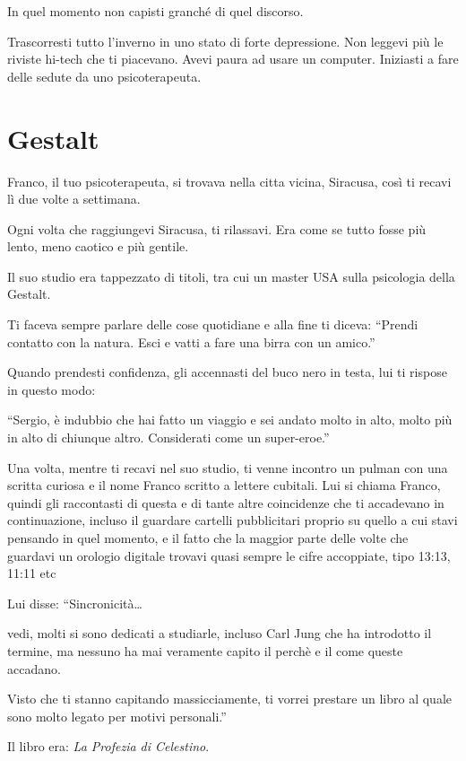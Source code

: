 In quel momento non capisti granché di quel discorso.

Trascorresti tutto l'inverno in uno stato di forte depressione. Non leggevi più le riviste hi-tech che ti piacevano. Avevi paura ad usare un computer. Iniziasti a fare delle sedute da uno psicoterapeuta.

\section{Gestalt}
\label{gestalt}

Franco, il tuo psicoterapeuta, si trovava nella citta vicina, Siracusa, così ti recavi lì due volte a settimana.

Ogni volta che raggiungevi Siracusa, ti rilassavi. Era come se tutto fosse più lento, meno caotico e più gentile.

Il suo studio era tappezzato di titoli, tra cui un master USA sulla psicologia della Gestalt.

Ti faceva sempre parlare delle cose quotidiane e alla fine ti diceva: “Prendi contatto con la natura. Esci e vatti a fare una birra con un amico.”

Quando prendesti confidenza, gli accennasti del buco nero in testa, lui ti rispose in questo modo:

“Sergio, è indubbio che hai fatto un viaggio e sei andato molto in alto, molto più in alto di chiunque altro. Considerati come un super-eroe.”

Una volta, mentre ti recavi nel suo studio, ti venne incontro un pulman con una scritta curiosa e il nome Franco scritto a lettere cubitali. Lui si chiama Franco, quindi gli raccontasti di questa e di tante altre coincidenze che ti accadevano in continuazione, incluso il guardare cartelli pubblicitari proprio su quello a cui stavi pensando in quel momento, e il fatto che la maggior parte delle volte che guardavi un orologio digitale trovavi quasi sempre le cifre accoppiate, tipo 13:13, 11:11 etc

Lui disse: “Sincronicità\ldots

vedi, molti si sono dedicati a studiarle, incluso Carl Jung che ha introdotto il termine, ma nessuno ha mai veramente capito il perchè e il come queste accadano.

Visto che ti stanno capitando massicciamente, ti vorrei prestare un libro al quale sono molto legato per motivi personali.”

Il libro era: \textit{La Profezia di Celestino}.

